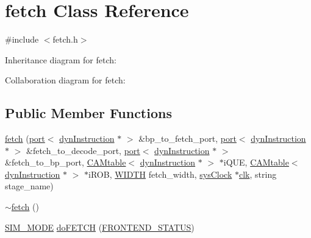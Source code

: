 \hypertarget{classfetch}{
\section{fetch Class Reference}
\label{classfetch}
}


{\ttfamily \#include $<$fetch.h$>$}



Inheritance diagram for fetch:


Collaboration diagram for fetch:
\subsection*{Public Member Functions}
\begin{DoxyCompactItemize}
\item 
\hyperlink{classfetch_a26e2014f97a0e55197156504b5bbcbf5}{fetch} (\hyperlink{classport}{port}$<$ \hyperlink{classdynInstruction}{dynInstruction} $\ast$ $>$ \&bp\_\-to\_\-fetch\_\-port, \hyperlink{classport}{port}$<$ \hyperlink{classdynInstruction}{dynInstruction} $\ast$ $>$ \&fetch\_\-to\_\-decode\_\-port, \hyperlink{classport}{port}$<$ \hyperlink{classdynInstruction}{dynInstruction} $\ast$ $>$ \&fetch\_\-to\_\-bp\_\-port, \hyperlink{classCAMtable}{CAMtable}$<$ \hyperlink{classdynInstruction}{dynInstruction} $\ast$ $>$ $\ast$iQUE, \hyperlink{classCAMtable}{CAMtable}$<$ \hyperlink{classdynInstruction}{dynInstruction} $\ast$ $>$ $\ast$iROB, \hyperlink{global_2global_8h_a6fa2e24b8a418fa215e183264cbea3aa}{WIDTH} fetch\_\-width, \hyperlink{classsysClock}{sysClock} $\ast$\hyperlink{g__objs_8h_afc4784c140eed1743728e83840e91c12}{clk}, string stage\_\-name)
\item 
\hyperlink{classfetch_a7bb4278b048d48d4225cb44b6553b3d6}{$\sim$fetch} ()
\item 
\hyperlink{stage_8h_ac68af0001af4b7049b2435ded74c4e5e}{SIM\_\-MODE} \hyperlink{classfetch_af54aeae9d6168f3c25ce11b8c2f60d2a}{doFETCH} (\hyperlink{global_2global_8h_afd483fa40f0fa2b1ac067845b91f0c6e}{FRONTEND\_\-STATUS})
\end{DoxyCompactItemize}


